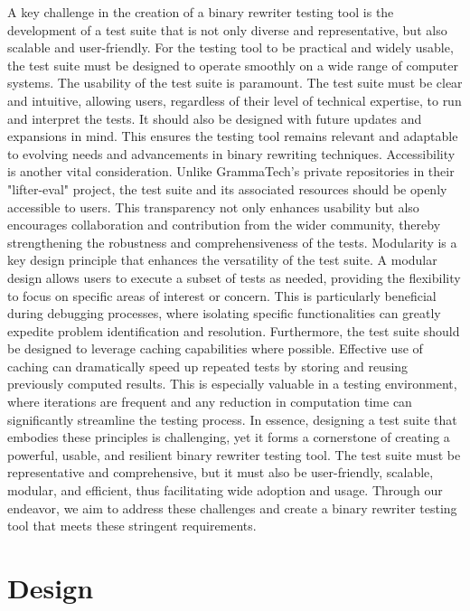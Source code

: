 \documentclass[a4paper,11pt,oneside]{report}
\begin{document}
A key challenge in the creation of a binary rewriter testing tool is the development of
a test suite that is not only diverse and representative, but also scalable and user-friendly.
For the testing tool to be practical and widely usable, the test suite must be designed to
operate smoothly on a wide range of computer systems.
The usability of the test suite is paramount. The test suite must be clear and
intuitive, allowing users, regardless of their level of technical expertise, to run and interpret
the tests. It should also be designed with future updates and expansions in mind. This
ensures the testing tool remains relevant and adaptable to evolving needs and
advancements in binary rewriting techniques.
Accessibility is another vital consideration. Unlike GrammaTech's private repositories
in their "lifter-eval" project, the test suite and its associated resources should be openly
accessible to users. This transparency not only enhances usability but also encourages
collaboration and contribution from the wider community, thereby strengthening the
robustness and comprehensiveness of the tests.
Modularity is a key design principle that enhances the versatility of the test suite. A
modular design allows users to execute a subset of tests as needed, providing the flexibility
to focus on specific areas of interest or concern. This is particularly beneficial during
debugging processes, where isolating specific functionalities can greatly expedite problem
identification and resolution.
Furthermore, the test suite should be designed to leverage caching capabilities
where possible. Effective use of caching can dramatically speed up repeated tests by storing
and reusing previously computed results. This is especially valuable in a testing
environment, where iterations are frequent and any reduction in computation time can
significantly streamline the testing process.
In essence, designing a test suite that embodies these principles is challenging, yet it
forms a cornerstone of creating a powerful, usable, and resilient binary rewriter testing tool.
The test suite must be representative and comprehensive, but it must also be user-friendly,
scalable, modular, and efficient, thus facilitating wide adoption and usage. Through our
endeavor, we aim to address these challenges and create a binary rewriter testing tool that
meets these stringent requirements.

\chapter{Design}
\end{document}
